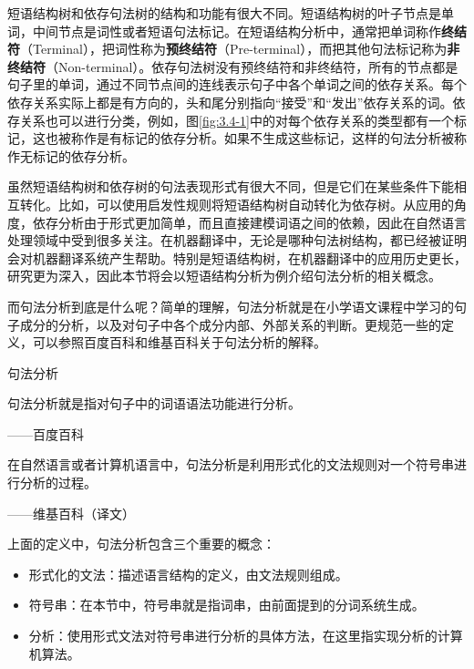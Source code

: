 \parinterval 短语结构树和依存句法树的结构和功能有很大不同。短语结构树的叶子节点是单词，中间节点是词性或者短语句法标记。在短语结构分析中，通常把单词称作{\small\sffamily\bfseries{终结符}}（Terminal），把词性称为{\small\sffamily\bfseries{预终结符}}（Pre-terminal），而把其他句法标记称为{\small\sffamily\bfseries{非终结符}}（Non-terminal）。依存句法树没有预终结符和非终结符，所有的节点都是句子里的单词，通过不同节点间的连线表示句子中各个单词之间的依存关系。每个依存关系实际上都是有方向的，头和尾分别指向“接受”和“发出”依存关系的词。依存关系也可以进行分类，例如，图\ref{fig:3.4-1}中的对每个依存关系的类型都有一个标记，这也被称作是有标记的依存分析。如果不生成这些标记，这样的句法分析被称作无标记的依存分析。

\parinterval 虽然短语结构树和依存树的句法表现形式有很大不同，但是它们在某些条件下能相互转化。比如，可以使用启发性规则将短语结构树自动转化为依存树。从应用的角度，依存分析由于形式更加简单，而且直接建模词语之间的依赖，因此在自然语言处理领域中受到很多关注。在机器翻译中，无论是哪种句法树结构，都已经被证明会对机器翻译系统产生帮助。特别是短语结构树，在机器翻译中的应用历史更长，研究更为深入，因此本节将会以短语结构分析为例介绍句法分析的相关概念。

\parinterval 而句法分析到底是什么呢？简单的理解，句法分析就是在小学语文课程中学习的句子成分的分析，以及对句子中各个成分内部、外部关系的判断。更规范一些的定义，可以参照百度百科和维基百科关于句法分析的解释。

\begin{definition} 句法分析

句法分析就是指对句子中的词语语法功能进行分析。
\begin{flushright}——百度百科\end{flushright}

在自然语言或者计算机语言中，句法分析是利用形式化的文法规则对一个符号串进行分析的过程。
\begin{flushright}——维基百科（译文）\end{flushright}
\end{definition}

\parinterval 上面的定义中，句法分析包含三个重要的概念：

\begin{itemize}
\vspace{0.5em}
\item 形式化的文法：描述语言结构的定义，由文法规则组成。
\vspace{0.5em}
\item 符号串：在本节中，符号串就是指词串，由前面提到的分词系统生成。
\vspace{0.5em}
\item 分析：使用形式文法对符号串进行分析的具体方法，在这里指实现分析的计算机算法。
\vspace{0.5em}
\end{itemize}

